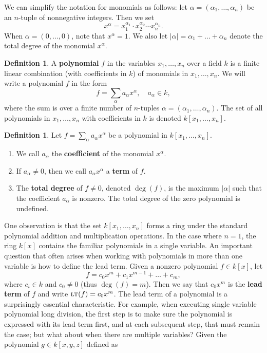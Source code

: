 \documentclass[MS, xcolor=dvipsnames]{wfuthesis}
\newcommand{\LT}{\ensuremath{\text{\sc lt}}}
\theoremstyle{definition}
\newtheorem{definition}[theorem]{Definition}
\begin{document}
We can simplify the notation for monomials as follows: let $\alpha = (\alpha_1,\dots,\alpha_n)$ be an $n$-tuple of nonnegative integers. Then we set
\[ x^\alpha = x_1^{\alpha_1} \cdot x_2^{\alpha_2} \cdots x_n^{\alpha_n}. \]
When $\alpha=(0,\dots,0)$, note that $x^\alpha=1$. We also let $|\alpha| = \alpha_1 + \dots + \alpha_n$ denote the total degree of the monomial $x^\alpha$.
\begin{definition}
  A \textbf{polynomial} $f$ in the variables $x_1,\dots,x_n$ over a field $k$ is a finite linear combination (with coefficients in $k$) of monomials in $x_1,\dots,x_n$. We will write a polynomial $f$ in the form
  \[ f = \sum_\alpha a_\alpha x^\alpha,\quad a_\alpha \in k, \]
  where the sum is over a finite number of $n$-tuples $\alpha = (\alpha_1,\dots,\alpha_n)$. The set of all polynomials in $x_1,\dots,x_n$ with coefficients in $k$ is denoted $k[x_1,\dots,x_n]$.
\end{definition}
\begin{definition}
  Let $f = \sum_\alpha a_\alpha x^\alpha$ be a polynomial in $k[x_1,\dots,x_n]$.
  \begin{enumerate}[label=(\roman*)]
    \item We call $a_\alpha$ the \textbf{coefficient} of the monomial $x^\alpha$.
    \item If $a_\alpha\ne0$, then we call $a_\alpha x^\alpha$ a \textbf{term} of $f$.
    \item The \textbf{total degree} of $f \ne 0$, denoted $\deg(f)$, is the maximum $|\alpha|$ such that the coefficient $a_\alpha$ is nonzero. The total degree of the zero polynomial is undefined.
  \end{enumerate}
\end{definition}
One observation is that the set $k[x_1,\dots,x_n]$ forms a ring under the standard polynomial addition and multiplication operations. In the case where $n=1$, the ring $k[x]$ contains the familiar polynomials in a single variable. An important question that often arises when working with polynomials in more than one variable is how to define the lead term. Given a nonzero polynomial $f \in k[x]$, let
\[ f = c_0x^m + c_1x^{m-1} + \dots + c_m, \]
where $c_i \in k$ and $c_0 \ne 0$ (thus $\deg(f)=m$). Then we say that $c_0x^m$ is the \textbf{lead term} of $f$ and write $\LT(f)=c_0x^m$. The lead term of a polynomial is a surprisingly essential characteristic. For example, when executing single variable polynomial long division, the first step is to make sure the polynomial is expressed with its lead term first, and at each subsequent step, that must remain the case; but what about when there are multiple variables? Given the polynomial $g \in k[x,y,z]$ defined as
\end{document}
